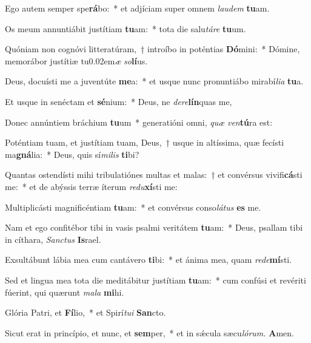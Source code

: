 \item Ego autem semper spe\textbf{rá}bo:~* et adjíciam super omnem \textit{laudem} \textbf{tu}am.
\item Os meum annuntiábit justítiam \textbf{tu}am:~* tota die salu\tinyhspace\textit{táre} \textbf{tu}um.
\item Quóniam non cognóvi litteratúram,~† introíbo in poténtias \textbf{Dó}mini:~* Dómine, memorábor justítiæ tu\kern 0.02em\textit{æ} \textit{so}\textbf{lí}us.
\item Deus, docuísti me a juventúte \textbf{me}a:~* et usque nunc pronuntiábo mirabí\tinyhspace\textit{lia} \textbf{tu}a.
\item Et usque in senéctam et \textbf{sé}nium:~* Deus, ne \textit{dere}\textbf{lín}quas me,
\item Donec annúntiem bráchium \textbf{tu}um~* generatióni omni, \textit{quæ} \textit{ven}\textbf{tú}ra est:
\item Poténtiam tuam, et justítiam tuam, Deus,~† usque in altíssima, quæ fecísti ma\textbf{gná}lia:~* Deus, quis sí\textit{milis} \textbf{ti}bi?
\item Quantas ostendísti mihi tribulatiónes multas et malas:~† et convérsus vivifi\textbf{cá}sti me:~* et de abýssis terræ íterum \textit{redu}\textbf{xí}sti me:
\item Multiplicásti magnificéntiam \textbf{tu}am:~* et convérsus conso\textit{látus} \textbf{es} me.
\item Nam et ego confitébor tibi in vasis psalmi veritátem \textbf{tu}am:~* Deus, psallam tibi in cíthara, \textit{Sanctus} \textbf{Is}rael.
\item Exsultábunt lábia mea cum cantávero \textbf{ti}bi:~* et ánima mea, quam \textit{rede}\textbf{mí}sti.
\item Sed et lingua mea tota die meditábitur justítiam \textbf{tu}am:~* cum confúsi et revériti fúerint, qui quærunt \textit{mala} \textbf{mi}hi.
\item Glória Patri, et \textbf{Fí}lio,~* et Spirí\tinyhspace\textit{tui} \textbf{San}cto.
\item Sicut erat in princípio, et nunc, et \textbf{sem}per,~* et in sǽcula sæcu\tinyhspace\textit{lórum.} \textbf{A}men.
